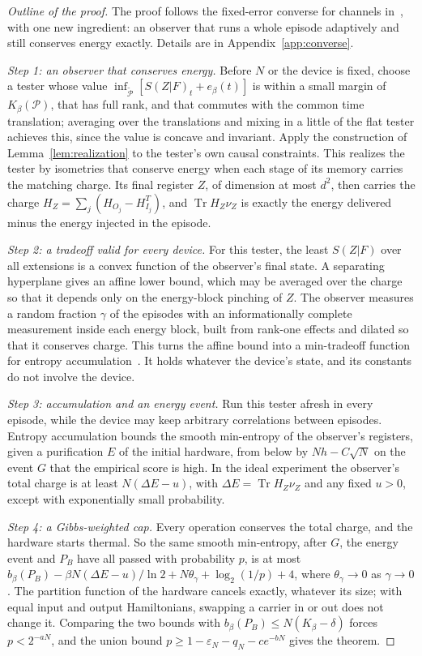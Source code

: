 \documentclass[11pt]{article}
\theoremstyle{definition}
\theoremstyle{remark}
\newcommand{\Tr}{\operatorname{Tr}}
\newcommand{\Kb}{K_\beta}
\newcommand{\Pp}{\mathcal P}
\newcommand{\Pt}{\widetilde{\mathcal P}}
\begin{document}
\begin{proof}[Outline of the proof]
The proof follows the fixed-error converse for channels in~\cite{SaveWork}, with one new ingredient: an observer that runs a whole episode adaptively and still conserves energy exactly. Details are in Appendix~\ref{app:converse}.

\emph{Step 1: an observer that conserves energy.} Before $N$ or the device is fixed, choose a tester whose value $\inf_{\Pt}[S(Z|F)_t+e_\beta(t)]$ is within a small margin of $\Kb(\Pp)$, that has full rank, and that commutes with the common time translation; averaging over the translations and mixing in a little of the flat tester achieves this, since the value is concave and invariant. Apply the construction of Lemma~\ref{lem:realization} to the tester's own causal constraints. This realizes the tester by isometries that conserve energy when each stage of its memory carries the matching charge. Its final register $Z$, of dimension at most $d^2$, then carries the charge $H_Z=\sum_j(H_{O_j}-H_{I_j}^T)$, and $\Tr H_Z\nu_Z$ is exactly the energy delivered minus the energy injected in the episode.

\emph{Step 2: a tradeoff valid for every device.} For this tester, the least $S(Z|F)$ over all extensions is a convex function of the observer's final state. A separating hyperplane gives an affine lower bound, which may be averaged over the charge so that it depends only on the energy-block pinching of $Z$. The observer measures a random fraction $\gamma$ of the episodes with an informationally complete measurement inside each energy block, built from rank-one effects and dilated so that it conserves charge. This turns the affine bound into a min-tradeoff function for entropy accumulation~\cite{DFR20}. It holds whatever the device's state, and its constants do not involve the device.

\emph{Step 3: accumulation and an energy event.} Run this tester afresh in every episode, while the device may keep arbitrary correlations between episodes. Entropy accumulation bounds the smooth min-entropy of the observer's registers, given a purification $E$ of the initial hardware, from below by $N h-C\sqrt N$ on the event $G$ that the empirical score is high. In the ideal experiment the observer's total charge is at least $N(\Delta E-u)$, with $\Delta E=\Tr H_Z\nu_Z$ and any fixed $u>0$, except with exponentially small probability.

\emph{Step 4: a Gibbs-weighted cap.} Every operation conserves the total charge, and the hardware starts thermal. So the same smooth min-entropy, after $G$, the energy event and $P_B$ have all passed with probability $p$, is at most $b_\beta(P_B)-\beta N(\Delta E-u)/\ln2+N\theta_\gamma+\log_2(1/p)+4$, where $\theta_\gamma\to0$ as $\gamma\to0$. The partition function of the hardware cancels exactly, whatever its size; with equal input and output Hamiltonians, swapping a carrier in or out does not change it. Comparing the two bounds with $b_\beta(P_B)\le N(\Kb-\delta)$ forces $p<2^{-aN}$, and the union bound $p\ge1-\varepsilon_N-q_N-ce^{-bN}$ gives the theorem.
\end{proof}
\end{document}
